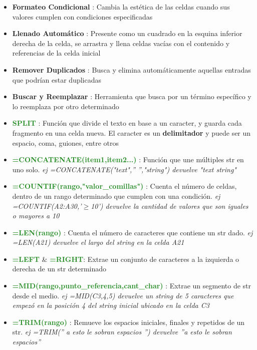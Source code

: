 \begin{itemize}
    \item {\textbf{Formateo Condicional} : Cambia la estética de las celdas cuando sus valores cumplen con condiciones especificadas}
    \item {\textbf{Llenado Automático} : Presente como un cuadrado en la esquina inferior derecha de la celda, se arrastra y llena celdas vacías con el contenido y referencias de la celda inicial}
    \item {\textbf{Remover Duplicados} : Busca y elimina automáticamente aquellas entradas que podrían estar duplicadas} 
    \item {\textbf{Buscar y Reemplazar} : Herramienta que busca por un término específico y lo reemplaza por otro determinado}
    \item {\textcolor{ForestGreen}{\textbf{SPLIT}} : Función que divide el texto en base a un caracter, y guarda cada fragmento en una celda nueva. El caracter es un \textbf{delimitador} y puede ser un espacio, coma, guiones, entre otros}
    \item {\textcolor{ForestGreen}{\textbf{=CONCATENATE(item1,item2...)}} : Función que une múltiples \gls{str} en uno solo. \textit{ej =CONCATENATE("text",'' '',"string") devuelve "text string"}}
    \item {\textcolor{ForestGreen}{\textbf{=COUNTIF(rango,"valor\_comillas")}} : Cuenta el número de celdas, dentro de un rango determinado que cumplen con una condición. \textit{ej =COUNTIF(A2:A30,'${\geq}$10') devuelve la cantidad de valores que son iguales o mayores a 10}}
    \item {\textcolor{ForestGreen}{\textbf{=LEN(rango)}} : Cuenta el número de caracteres que contiene un \gls{str} dado. \textit{ej =LEN(A21) devuelve el largo del string en la celda A21}}
    \item {\textcolor{ForestGreen}{\textbf{=LEFT}} \& \textcolor{ForestGreen}{\textbf{=RIGHT}}: Extrae un conjunto de caracteres a la izquierda o derecha de un \gls{str} determinado}
    \item {\textcolor{ForestGreen}{\textbf{=MID(rango,punto\_referencia,cant\_char)}} : Extrae un segmento de \gls{str} desde el medio. \textit{ej =MID(C3,4,5) devuelve un string de 5 caracteres que empezó en la posición 4 del string inicial ubicado en la celda C3}}
    \item {\textcolor{ForestGreen}{\textbf{=TRIM(rango)}} : Remueve los espacios iniciales, finales y repetidos de un \gls{str}. \textit{ej =TRIM('' a esto le sobran espacios  '') devuelve ''a esto le sobran espacios''}}

\end{itemize}

